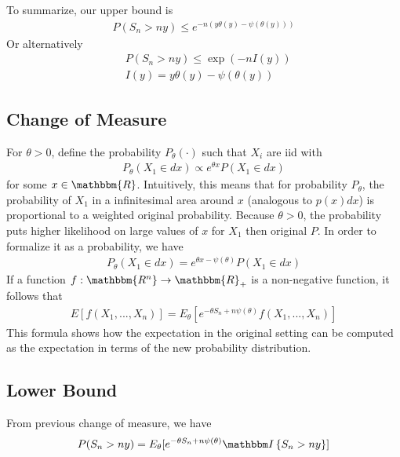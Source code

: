 To summarize, our upper bound is 
    \begin{align*}
        P(S_n > ny) \leq e^{-n(y \theta(y) - \psi(\theta(y)))}
    \end{align*}
Or alternatively
    \begin{align*}
        & P(S_n > ny) \leq \exp(-n I(y)) \\
        & I(y) = y \theta(y) - \psi(\theta(y)) \tag{Rate function}
    \end{align*}


\subsection{Change of Measure}
For $\theta > 0$, define the probability $P_\theta(\cdot)$ such that $X_i$ are iid with 
    \begin{align*}
        P_\theta(X_1 \in dx) \propto e^{\theta x}P(X_1 \in dx)
    \end{align*}
for some $x \in \mathbbm{R}$. Intuitively, this means that for probability $P_\theta$, the probability of $X_1$ in a infinitesimal area around $x$ (analogous to $p(x)dx$) is proportional to a weighted original probability. Because $\theta > 0$, the probability puts higher likelihood on large values of $x$ for $X_1$ then original $P$. In order to formalize it as a probability, we have 
    \begin{align*}
        P_\theta(X_1 \in dx) = e^{\theta x - \psi(\theta)}P(X_1 \in dx)
    \end{align*}
If a function $f: \mathbbm{R^n} \to \mathbbm{R}_+$ is a non-negative function, it follows that 
    \begin{align*}
        E[f(X_1, ..., X_n)] = E_\theta[e^{-\theta S_n + n \psi(\theta)} f(X_1, ..., X_n)]
    \end{align*}
This formula shows how the expectation in the original setting can be computed as the expectation in terms of the new probability distribution. 

\subsection{Lower Bound} 
From previous change of measure, we have 
    \begin{align*}
        P(S_n > ny) = E_\theta[e^{-\theta S_n + n \psi(\theta)} \indic{S_n > ny}]
    \end{align*}

